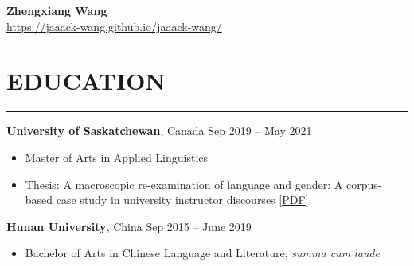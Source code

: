\documentclass[a4paper, 11pt]{article}  %
\begin{document}

\begin{center}

	\huge \textbf{Zhengxiang Wang} \vspace{11pt} \\  %
	\small \url{https://jaaack-wang.github.io/jaaack-wang/} 

\end{center}

\section*{EDUCATION} %
\hrule %
\vspace{11pt} %

\textbf{University of Saskatchewan}, Canada \hfill Sep 2019 – May 2021 %

\begin{itemize}
	\itemsep0em %
	
	\item{Master of Arts in Applied Linguistics}
	\item{Thesis: A macroscopic re-examination of language and gender: A corpus-based case study in university instructor discourses [\href{https://harvest.usask.ca/bitstream/handle/10388/13387/WANG-THESIS-2021.pdf?sequence=1\&isAllowed=y}{PDF}]}
	
\end{itemize}

\vspace{11pt}

\noindent
\textbf{Hunan University}, China \hfill Sep 2015 – June 2019

\begin{itemize}
	\itemsep0em 
	
	\item{Bachelor of Arts in Chinese Language and Literature; \emph{summa cum laude}}
	
\end{itemize}


\end{document}
